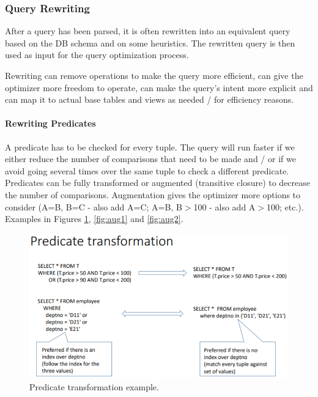

\subsubsection{Query Rewriting}

After a query has been parsed, it is often rewritten into an equivalent query based on the DB schema and on some heuristics. The rewritten query is then used as input for the query optimization process. 

Rewriting can remove operations to make the query more efficient, can give the optimizer more freedom to operate, can make the query's intent more explicit and can map it to actual base tables and views as needed / for efficiency reasons.

\paragraph{Rewriting Predicates}
A predicate has to be checked for every tuple. The query will run faster if we either reduce the number of comparisons that need to be made and / or if we avoid going several times over the same tuple to check a different predicate. Predicates can be fully transformed or augmented (transitive closure) to decrease the number of comparisons. Augmentation gives the optimizer more options to consider (A=B, B=C - also add A=C; A=B, B$>$100 - also add A$>$100; etc.). Examples in Figures \ref{fig:transormation}, \ref{fig:aug1} and \ref{fig:aug2}.

\begin{figure}[h]
	\centering
	\includegraphics[scale=0.5]{images/3-transformation.PNG}
	\caption{Predicate transformation example.}
	\label{fig:transormation}
\end{figure}

